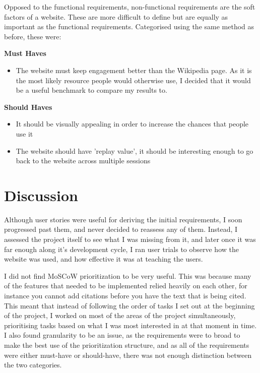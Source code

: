 \documentclass{l4proj}
\begin{document}
Opposed to the functional requirements, non-functional requirements are the soft factors of a website.  These are more difficult to define but are equally as important as the functional requirements.  Categorised using the same method as before, these were:

\textbf{Must Haves}

\begin{itemize}
    \item The website must keep engagement better than the Wikipedia page.  As it is the most likely resource people would otherwise use, I decided that it would be a useful benchmark to compare my results to.
\end{itemize}


\textbf{Should Haves}

\begin{itemize}
    \item It should be visually appealing in order to increase the chances that people use it
    \item The website should have 'replay value', it should be interesting enough to go back to the website across multiple sessions
\end{itemize}

\section{Discussion}

Although user stories were useful for deriving the initial requirements, I soon progressed past them, and never decided to reassess any of them.  Instead, I assessed the project itself to see what I was missing from it, and later once it was far enough along it's development cycle, I ran user trials to observe how the website was used, and how effective it was at teaching the users.

I did not find MoSCoW prioritization to be very useful.  This was because many of the features that needed to be implemented relied heavily on each other, for instance you cannot add citations before you have the text that is being cited.  This meant that instead of following the order of tasks I set out at the beginning of the project, I worked on most of the areas of the project simultaneously, prioritising tasks based on what I was most interested in at that moment in time.  I also found granularity to be an issue, as the requirements were to broad to make the best use of the prioritization structure, and as all of the requirements were either must-have or should-have, there was not enough distinction between the two categories.
\end{document}
